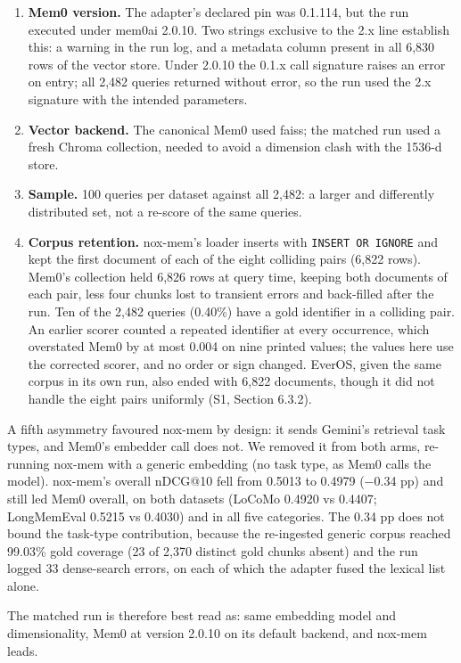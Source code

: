 \documentclass[a4paper,fleqn]{cas-sc}
\begin{document}
\begin{enumerate}
\def\labelenumi{(\alph{enumi})}
\item
  \textbf{Mem0 version.} The adapter's declared pin was 0.1.114, but the run executed under mem0ai 2.0.10. Two strings exclusive to the 2.x line establish this: a warning in the run log, and a metadata column present in all 6,830 rows of the vector store. Under 2.0.10 the 0.1.x call signature raises an error on entry; all 2,482 queries returned without error, so the run used the 2.x signature with the intended parameters.
\item
  \textbf{Vector backend.} The canonical Mem0 used faiss; the matched run used a fresh Chroma collection, needed to avoid a dimension clash with the 1536-d store.
\item
  \textbf{Sample.} 100 queries per dataset against all 2,482: a larger and differently distributed set, not a re-score of the same queries.
\item
  \textbf{Corpus retention.} nox-mem's loader inserts with \texttt{INSERT\ OR\ IGNORE} and kept the first document of each of the eight colliding pairs (6,822 rows). Mem0's collection held 6,826 rows at query time, keeping both documents of each pair, less four chunks lost to transient errors and back-filled after the run. Ten of the 2,482 queries (0.40\%) have a gold identifier in a colliding pair. An earlier scorer counted a repeated identifier at every occurrence, which overstated Mem0 by at most 0.004 on nine printed values; the values here use the corrected scorer, and no order or sign changed. EverOS, given the same corpus in its own run, also ended with 6,822 documents, though it did not handle the eight pairs uniformly (S1, Section 6.3.2).
\end{enumerate}

A fifth asymmetry favoured nox-mem by design: it sends Gemini's retrieval task types, and Mem0's embedder call does not. We removed it from both arms, re-running nox-mem with a generic embedding (no task type, as Mem0 calls the model). nox-mem's overall nDCG@10 fell from 0.5013 to 0.4979 (−0.34 pp) and still led Mem0 overall, on both datasets (LoCoMo 0.4920 vs 0.4407; LongMemEval 0.5215 vs 0.4030) and in all five categories. The 0.34 pp does not bound the task-type contribution, because the re-ingested generic corpus reached 99.03\% gold coverage (23 of 2,370 distinct gold chunks absent) and the run logged 33 dense-search errors, on each of which the adapter fused the lexical list alone.

The matched run is therefore best read as: same embedding model and dimensionality, Mem0 at version 2.0.10 on its default backend, and nox-mem leads.
\end{document}
